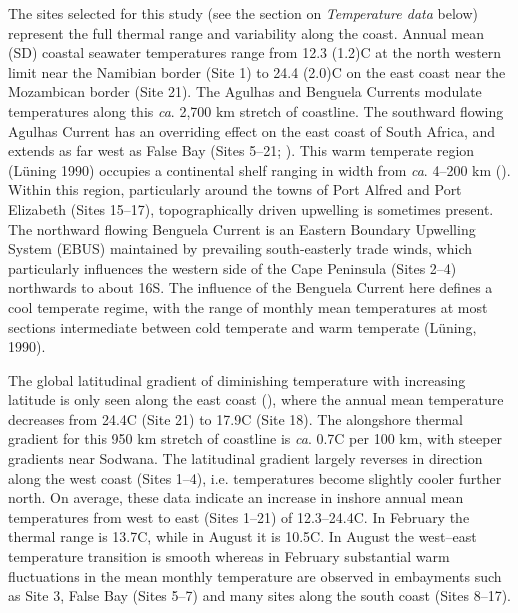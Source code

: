 \documentclass[a4paper,10pt,review]{elsarticle}
\begin{document}
The sites selected for this study (see the section on \emph{Temperature data} below) represent the full thermal range and variability along the coast. Annual mean (SD) coastal seawater temperatures range from 12.3 (1.2)\degree C at the north western limit near the Namibian border (Site 1) to 24.4 (2.0)\degree C on the east coast near the Mozambican border (Site 21). The Agulhas and Benguela Currents modulate temperatures along this \emph{ca}. 2,700 km stretch of coastline. The southward flowing Agulhas Current has an overriding effect on the east coast of South Africa, and extends as far west as False Bay (Sites 5--21; ). This warm temperate region (Lüning 1990) occupies a continental shelf ranging in width from \emph{ca}. 4--200 km (). Within this region, particularly around the towns of Port Alfred and Port Elizabeth (Sites 15--17), topographically driven upwelling is sometimes present. The northward flowing Benguela Current is an Eastern Boundary Upwelling System (EBUS) maintained by prevailing south-easterly trade winds, which particularly influences the western side of the Cape Peninsula (Sites 2--4) northwards to about 16\degree S. The influence of the Benguela Current here defines a cool temperate regime, with the range of monthly mean temperatures at most sections intermediate between cold temperate and warm temperate (Lüning, 1990).

The global latitudinal gradient of diminishing temperature with increasing latitude is only seen along the east coast (), where the annual mean temperature decreases from 24.4\degree C (Site 21) to 17.9\degree C (Site 18). The alongshore thermal gradient for this 950 km stretch of coastline is \emph{ca}. 0.7\degree C per 100 km, with steeper gradients near Sodwana. The latitudinal gradient largely reverses in direction along the west coast (Sites 1--4), i.e. temperatures become slightly cooler further north. On average, these data indicate an increase in inshore annual mean temperatures from west to east (Sites 1--21) of 12.3--24.4\degree C. In February the thermal range is 13.7\degree C, while in August it is 10.5\degree C. In August the west–east temperature transition is smooth whereas in February substantial warm fluctuations in the mean monthly temperature are observed in embayments such as Site 3, False Bay (Sites 5--7) and many sites along the south coast (Sites 8--17).
\end{document}
